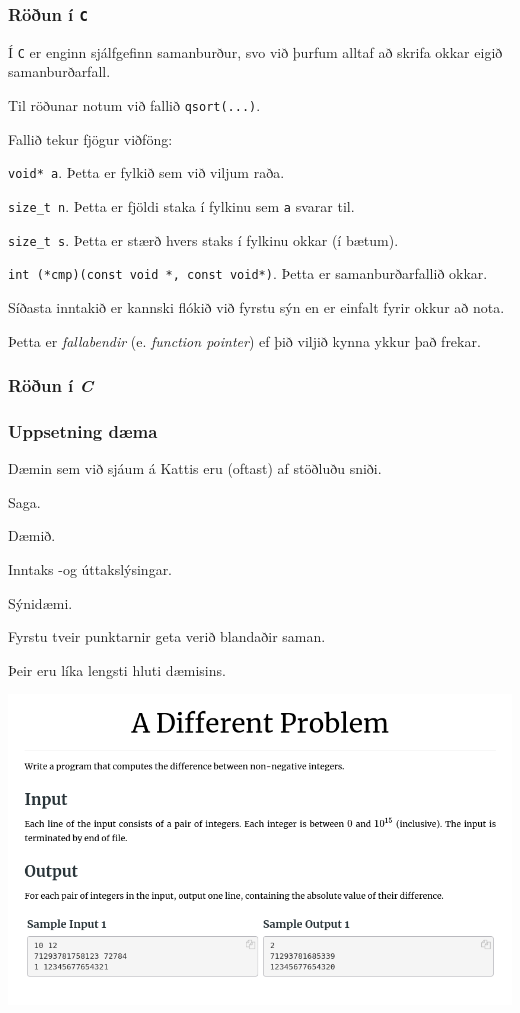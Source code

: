 {
	\frametitle{Röðun í \texttt{C}}
	{
		\item<1-> Í \texttt{C} er enginn sjálfgefinn samanburður, svo við þurfum alltaf að skrifa okkar eigið samanburðarfall.
		\item<2-> Til röðunar notum við fallið \texttt{qsort(...)}.
		\item<3-> Fallið tekur fjögur viðföng:
		{
			\item<4-> \texttt{void* a}. Þetta er fylkið sem við viljum raða.
			\item<5-> \texttt{size\_t n}. Þetta er fjöldi staka í fylkinu sem \texttt{a} svarar til.
			\item<6-> \texttt{size\_t s}. Þetta er stærð hvers staks í fylkinu okkar (í bætum).
			\item<7-> \texttt{int (*cmp)(const void *, const void*)}. Þetta er samanburðarfallið okkar.
		}
		\item<8-> Síðasta inntakið er kannski flókið við fyrstu sýn en er einfalt fyrir okkur að nota.
		\item<9-> Þetta er \emph{fallabendir} (e. \emph{function pointer}) ef þið viljið kynna ykkur það frekar.
	}
}

{
	\frametitle{Röðun í \emph{C}}
}

{
	\frametitle{Uppsetning dæma}
	{
		\item<1-> Dæmin sem við sjáum á Kattis eru (oftast) af stöðluðu sniði.
		{
			\item<2-> Saga.
			\item<3-> Dæmið.
			\item<4-> Inntaks -og úttakslýsingar.
			\item<5-> Sýnidæmi.
		}
		\item<6-> Fyrstu tveir punktarnir geta verið blandaðir saman.
		\item<7-> Þeir eru líka lengsti hluti dæmisins.
	}
}
{
	\includegraphics[scale = 0.38]{daemi}
}

